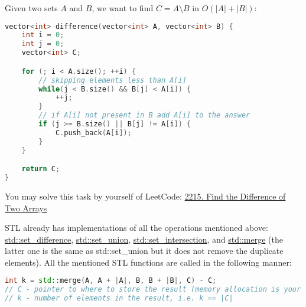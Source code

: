 
Given two sets $A$ and $B$, we want to find $C = A \setminus B$ in $O(|A| + |B|)$:

\begin{lstlisting}[language=C++]
vector<int> difference(vector<int> A, vector<int> B) {
    int i = 0;
    int j = 0;
    vector<int> C;

    for (; i < A.size(); ++i) {
        // skipping elements less than A[i]
        while(j < B.size() && B[j] < A[i]) {
            ++j;
        }
        // if A[i] not present in B add A[i] to the answer
        if (j >= B.size() || B[j] != A[i]) {
            C.push_back(A[i]);
        }
    }

    return C;
}
\end{lstlisting}

You may solve this task by yourself of LeetCode: \href{https://leetcode.com/problems/find-the-difference-of-two-arrays/description/}{2215. Find the Difference of Two Arrays}


STL already has implementations of all the operations mentioned above: \href{https://cplusplus.com/reference/algorithm/set\_difference/}{std::set\_difference}, \href{https://cplusplus.com/reference/algorithm/set\_union/}{std::set\_union}, \href{https://cplusplus.com/reference/algorithm/set\_intersection/}{std::set\_intersection}, and \href{https://cplusplus.com/reference/algorithm/merge/}{std::merge} (the latter one is the same as std::set\_union but it does not remove the duplicate elements). All the mentioned STL functions are called in the following manner:

\begin{lstlisting}[language=C++]
int k = std::merge(A, A + |A|, B, B + |B|, C) - C;
// C - pointer to where to store the result (memory allocation is your responsibility)
// k - number of elements in the result, i.e. k == |C|
\end{lstlisting}





